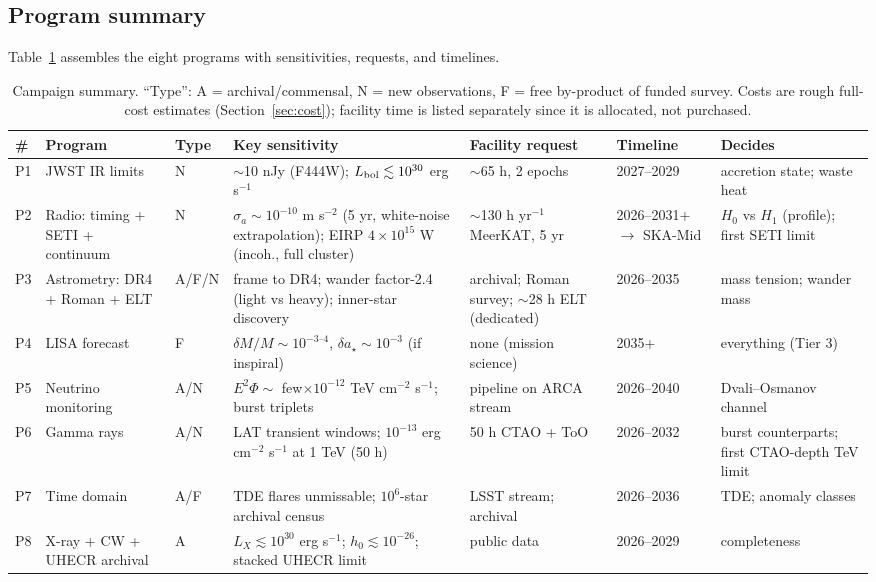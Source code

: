 \documentclass[11pt]{article}
\newcommand{\astar}{\ensuremath{a_\star}}
\begin{document}
\subsection{Program summary}

Table~\ref{tab:programs} assembles the eight programs with sensitivities, requests, and timelines.

\begin{table}[tbp]
\centering
\caption{Campaign summary. ``Type'': A = archival/commensal, N = new observations, F = free by-product of funded survey. Costs are rough full-cost estimates (Section~\ref{sec:cost}); facility time is listed separately since it is allocated, not purchased.}
\label{tab:programs}
\scriptsize
\begin{tabular}{p{0.45cm}p{2.5cm}p{0.5cm}p{3.6cm}p{2.5cm}p{1.6cm}p{2.2cm}}
\toprule
\# & Program & Type & Key sensitivity & Facility request & Timeline & Decides \\
\midrule
P1 & JWST IR limits & N & $\sim$10 nJy (F444W); $L_{\rm bol} \lesssim 10^{30}$ erg s$^{-1}$ & $\sim$65 h, 2 epochs & 2027--2029 & accretion state; waste heat \\
P2 & Radio: timing + SETI + continuum & N & $\sigma_a \sim 10^{-10}$ m s$^{-2}$ (5 yr, white-noise extrapolation); EIRP $4\times10^{15}$ W (incoh., full cluster) & $\sim$130 h yr$^{-1}$ MeerKAT, 5 yr & 2026--2031+ $\to$ SKA-Mid & $H_0$ vs $H_1$ (profile); first SETI limit \\
P3 & Astrometry: DR4 + Roman + ELT & A/F/N & frame to DR4; wander factor-2.4 (light vs heavy); inner-star discovery & archival; Roman survey; $\sim$28 h ELT (dedicated) & 2026--2035 & mass tension; wander mass \\
P4 & LISA forecast & F & $\delta M/M \sim 10^{-3\text{--}4}$, $\delta\astar \sim 10^{-3}$ (if inspiral) & none (mission science) & 2035+ & everything (Tier 3) \\
P5 & Neutrino monitoring & A/N & $E^{2}\Phi \sim$ few$\times10^{-12}$ TeV cm$^{-2}$ s$^{-1}$; burst triplets & pipeline on ARCA stream & 2026--2040 & Dvali--Osmanov channel \\
P6 & Gamma rays & A/N & LAT transient windows; $10^{-13}$ erg cm$^{-2}$ s$^{-1}$ at 1 TeV (50 h) & 50 h CTAO + ToO & 2026--2032 & burst counterparts; first CTAO-depth TeV limit \\
P7 & Time domain & A/F & TDE flares unmissable; $10^{6}$-star archival census & LSST stream; archival & 2026--2036 & TDE; anomaly classes \\
P8 & X-ray + CW + UHECR archival & A & $L_X \lesssim 10^{30}$ erg s$^{-1}$; $h_0 \lesssim 10^{-26}$; stacked UHECR limit & public data & 2026--2029 & completeness \\
\bottomrule
\end{tabular}
\end{table}
\end{document}
